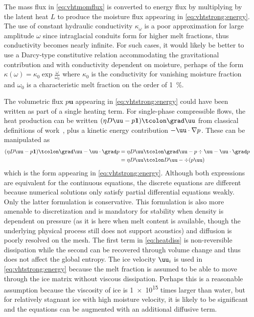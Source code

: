 The mass flux in \eqref{eq:vhtmomflux} is converted to energy flux by multiplying by the latent heat $L$ to produce the moisture flux appearing in \eqref{eq:vhtstrong:energy}.
The use of constant hydraulic conductivity $\kappa_\omega$ is a poor approximation for large amplitude $\omega$ since intraglacial conduits form for higher melt fractions, thus conductivity becomes nearly infinite.
For such cases, it would likely be better to use a Darcy-type constitutive relation accommodating the gravitational contribution and with conductivity dependent on moisture, perhaps of the form $\kappa(\omega) = \kappa_0 \exp \frac{\omega}{\omega_0}$ where $\kappa_0$ is the conductivity for vanishing moisture fraction and $\omega_0$ is a characteristic melt fraction on the order of \SI{1}{\percent}.

The volumetric flux $p\bm u$ appearing in \eqref{eq:vhtstrong:energy} could have been written as part of a single heating term.
For single-phase compressible flows, the heat production can be written $(\eta D\uu - p\bm 1)\tcolon \grad \uu$ from classical definitions of work~\citep[\eg][]{hutter2004continuum}, plus a kinetic energy contribution $-\uu\cdot\nabla p$.
These can be manipulated as
\begin{equation}\label{eq:heatdiss}
  \begin{split}
    (\eta D\uu - p\bm 1)\tcolon \grad \uu - \uu\cdot\grad p &= \eta D\uu\tcolon \grad\uu - p\div\uu - \uu\cdot\grad p \\
    &= \eta D\uu\tcolon D\uu - \div (p\uu)
  \end{split}
\end{equation}
which is the form appearing in \eqref{eq:vhtstrong:energy}.
Although both expressions are equivalent for the continuous equations, the discrete equations are different because numerical solutions only satisfy partial differential equations weakly.
Only the latter formulation is conservative.
This formulation is also more amenable to discretization and is mandatory for stability when density is dependent on pressure (as it is here when melt content is available, though the underlying physical process still does not support acoustics) and diffusion is poorly resolved on the mesh.
The first term in \eqref{eq:heatdiss} is non-reversible dissipation while the second can be recovered through volume change and thus does not affect the global entropy.
The ice velocity $\uu_i$ is used in \eqref{eq:vhtstrong:energy} because the melt fraction is assumed to be able to move through the ice matrix without viscous dissipation.
Perhaps this is a reasonable assumption because the viscosity of ice is \num{1e15} times larger than water, but for relatively stagnant ice with high moisture velocity, it is likely to be significant and the equations can be augmented with an additional diffusive term.

